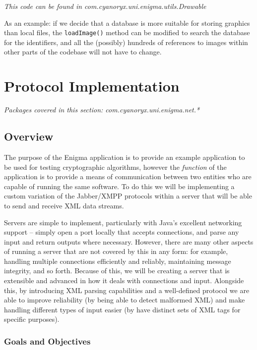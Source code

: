   
  
  \emph{This code can be found in com.cyanoryx.uni.enigma.utils.Drawable}
  
  As an example: if we decide that a database is more suitable for storing graphics than local files, the \verb!loadImage()! method can be modified to search the database for the identifiers, and all the (possibly) hundreds of references to images within other parts of the codebase will not have to change.

\section{Protocol Implementation}
  \emph{Packages covered in this section: com.cyanoryx.uni.enigma.net.*}
  
  \subsection{Overview}
  
  The purpose of the Enigma application is to provide an example application to be used for testing cryptographic algorithms, however the \emph{function} of the application is to provide a means of communication between two entities who are capable of running the same software. To do this we will be implementing a custom variation of the Jabber/XMPP protocols within a server that will be able to send and receive  XML data streams.
  
  Servers are simple to implement, particularly with Java's excellent networking support -- simply open a port locally that accepts connections, and parse any input and return outputs where necessary. However, there are many other aspects of running a server that are not covered by this in any form: for example, handling multiple connections efficiently and reliably, maintaining message integrity, and so forth. Because of this, we will be creating a server that is extensible and advanced in how it deals with connections and input. Alongside this, by introducing XML parsing capabilities and a well-defined protocol we are able to improve reliability (by being able to detect malformed XML) and make handling different types of input easier (by have distinct sets of XML tags for specific purposes).
  
    \subsubsection{Goals and Objectives}
    
